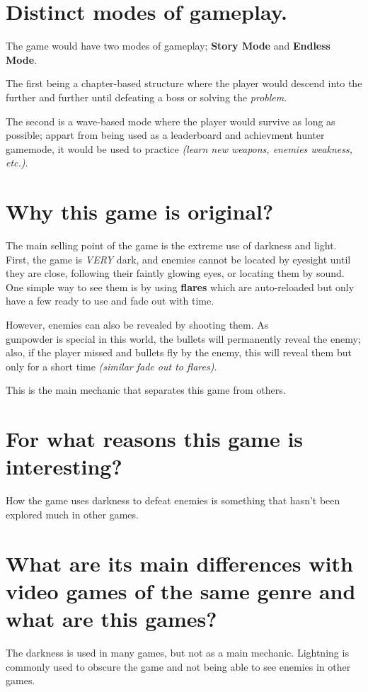 
\section{Distinct modes of gameplay.}
The game would have two modes of gameplay; \textbf{Story Mode} and \textbf{Endless Mode}.

The first being a chapter-based structure where the player would descend into the \hole further and further until defeating a boss or solving the \hole \textit{problem}.

The second is a wave-based mode where the player would survive as long as possible; appart from being used as a leaderboard and achievment hunter gamemode, it would be used to practice \textit{(learn new weapons, enemies weakness, etc.)}.


\section{Why this game is original?}
The main selling point of the game is the extreme use of darkness and light. First, the game is \textit{VERY} dark, and enemies cannot be located by eyesight until they are close, following their faintly glowing eyes, or locating them by sound. One simple way to see them is by using \textbf{flares} which are auto-reloaded but only have a few ready to use and fade out with time.

However, enemies can also be revealed by shooting them. As \\gunpowder is special in this world, the bullets will permanently reveal the enemy; also, if the player missed and bullets fly by the enemy, this will reveal them but only for a short time \textit{(similar fade out to flares)}.

This is the main mechanic that separates this game from others.


\section{For what reasons this game is interesting?}
How the game uses darkness to defeat enemies is something that hasn't been explored much in other games.


\section{What are its main differences with video games of the same genre and what are this games?}
The darkness is used in many games, but not as a main mechanic. Lightning is commonly used to obscure the game and not being able to see enemies in other games.